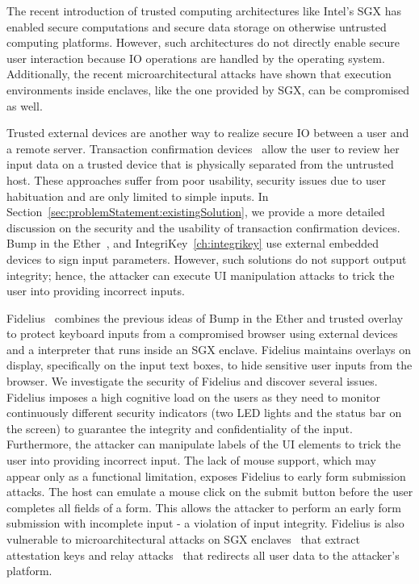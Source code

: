 The recent introduction of trusted computing architectures like Intel's SGX has enabled secure computations and secure data storage on otherwise untrusted computing platforms. However, such architectures do not directly enable secure user interaction because IO operations are handled by the operating system. Additionally, the recent microarchitectural attacks have shown that execution environments inside enclaves, like the one provided by SGX, can be compromised as well.


Trusted external devices are another way to realize secure IO between a user and a remote server. Transaction confirmation devices~\cite{filyanov2011uni,weigold2011secure} allow the user to review her input data on a trusted device that is physically separated from the untrusted host. These approaches suffer from poor usability, security issues due to user habituation and are only limited to simple inputs. In Section~\ref{sec:problemStatement:existingSolution}, we provide a more detailed discussion on the security and the usability of transaction confirmation devices. Bump in the Ether~\cite{McCPerRei2006}, and IntegriKey~\ref{ch:integrikey} use external embedded devices to sign input parameters. However, such solutions do not support output integrity; hence, the attacker can execute UI manipulation attacks to trick the user into providing incorrect inputs. 

Fidelius~\cite{Fidelius} combines the previous ideas of Bump in the Ether and trusted overlay to protect keyboard inputs from a compromised browser using external devices and a \js interpreter that runs inside an SGX enclave. Fidelius maintains overlays on display, specifically on the input text boxes, to hide sensitive user inputs from the browser. We investigate the security of Fidelius and discover several issues. Fidelius imposes a high cognitive load on the users as they need to monitor continuously different security indicators (two LED lights and the status bar on the screen) to guarantee the integrity and confidentiality of the input. Furthermore, the attacker can manipulate labels of the UI elements to trick the user into providing incorrect input. 
The lack of mouse support, which may appear only as a functional limitation, exposes Fidelius to early form submission attacks. The host can emulate a mouse click on the submit button before the user completes all fields of a form.
This allows the attacker to perform an early form submission with incomplete input - a violation of input integrity. Fidelius is also vulnerable to microarchitectural attacks on SGX enclaves~\cite{van2018foreshadow} that extract attestation keys and relay attacks~\cite{dhar2018proximitee} that redirects all user data to the attacker's platform.

